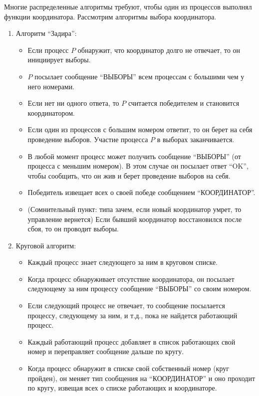 Многие распределенные алгоритмы требуют, чтобы один из процессов выполнял функции координатора. Рассмотрим алгоритмы выбора координатора.
\begin{enumerate}
\item
Алгоритм ``Задира'':
\begin{itemize}
    \setlength\itemsep{-0.4em}
    \item Если процесс $P$ обнаружит, что координатор долго не отвечает, то он инициирует выборы.
    \item $P$ посылает сообщение ``ВЫБОРЫ'' всем процессам с большими чем у него номерами.
    \item Если нет ни одного ответа, то $P$ считается победителем и становится координатором.
    \item Если один из процессов с большим номером ответит, то он берет на себя проведение выборов. Участие процесса $P$ в выборах заканчивается.
    \item В любой момент процесс может получить сообщение ``ВЫБОРЫ'' (от процесса с меньшим номером). В этом случае он посылает ответ ``OK'', чтобы сообщить, что он жив и берет проведение выборов на себя.
    \item Победитель извещает всех о своей победе сообщением ``КООРДИНАТОР''.
    \item (Сомнительный пункт: типа зачем, если новый координатор умрет, то управление вернется) Если бывший координатор восстановился после сбоя, то он проводит выборы.
\end{itemize}

\item
Круговой алгоритм:
\begin{itemize}
\item
Каждый процесс знает следующего за ним в круговом списке.
\item
Когда процесс обнаруживает отсутствие координатора, он посылает следующему за ним процессу сообщение ``ВЫБОРЫ'' со своим номером.
\item
Если следующий процесс не отвечает, то сообщение посылается процессу, следующему за ним, и т.д., пока не найдется работающий процесс.
\item
Каждый работающий процесс добавляет в список работающих свой номер и переправляет сообщение дальше по кругу.
\item
Когда процесс обнаружит в списке свой собственный номер (круг пройден), он меняет тип сообщения на ``КООРДИНАТОР'' и оно проходит по кругу, извещая всех о списке работающих и координаторе.
\end{itemize}
\end{enumerate}


